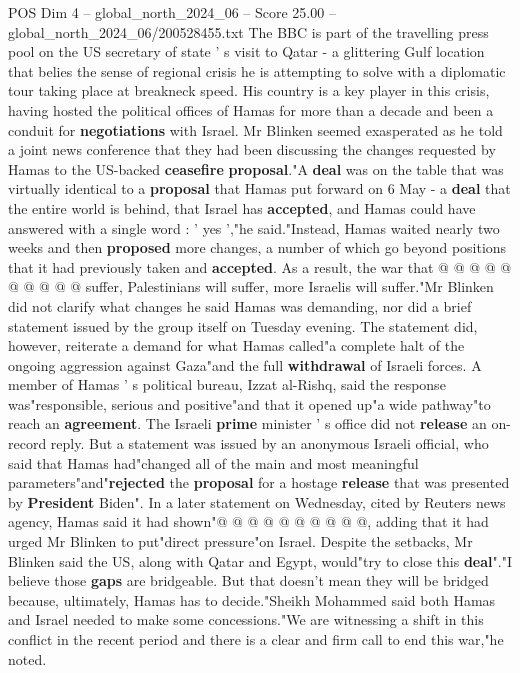 \begin{textsample}{POS Dim 4 – global\_north\_2024\_06 – Score 25.00 – global\_north\_2024\_06/200528455.txt}  \label{ex:f4_pos_145}
The BBC is part of the travelling press pool on the US secretary of state ' s visit to Qatar - a glittering Gulf location that belies the sense of regional crisis he is attempting to solve with a diplomatic tour taking place at breakneck speed.
His country is a key player in this crisis, having hosted the political offices of Hamas for more than a decade and been a conduit for \textbf{negotiations} with Israel.
Mr Blinken seemed exasperated as he told a joint news conference that they had been discussing the changes requested by Hamas to the US-backed \textbf{ceasefire} \textbf{proposal}."A \textbf{deal} was on the table that was virtually identical to a \textbf{proposal} that Hamas put forward on 6 May - a \textbf{deal} that the entire world is behind, that Israel has \textbf{accepted}, and Hamas could have answered with a single word : ' yes ',"he said."Instead, Hamas waited nearly two weeks and then \textbf{proposed} more changes, a number of which go beyond positions that it had previously taken and \textbf{accepted}.
As a result, the war that @ @ @ @ @ @ @ @ @ @ suffer, Palestinians will suffer, more Israelis will suffer."Mr Blinken did not clarify what changes he said Hamas was demanding, nor did a brief statement issued by the group itself on Tuesday evening.
The statement did, however, reiterate a demand for what Hamas called"a complete halt of the ongoing aggression against Gaza"and the full \textbf{withdrawal} of Israeli forces.
A member of Hamas ' s political bureau, Izzat al-Rishq, said the response was"responsible, serious and positive"and that it opened up"a wide pathway"to reach an \textbf{agreement}.
The Israeli \textbf{prime} minister ' s office did not \textbf{release} an on-record reply.
But a statement was issued by an anonymous Israeli official, who said that Hamas had"changed all of the main and most meaningful parameters"and"\textbf{rejected} the \textbf{proposal} for a hostage \textbf{release} that was presented by \textbf{President} Biden".
In a later statement on Wednesday, cited by Reuters news agency, Hamas said it had shown"@ @ @ @ @ @ @ @ @ @, adding that it had urged Mr Blinken to put"direct pressure"on Israel.
Despite the setbacks, Mr Blinken said the US, along with Qatar and Egypt, would"try to close this \textbf{deal}"."I believe those \textbf{gaps} are bridgeable.
But that doesn't mean they will be bridged because, ultimately, Hamas has to decide."Sheikh Mohammed said both Hamas and Israel needed to make some concessions."We are witnessing a shift in this conflict in the recent period and there is a clear and firm call to end this war,"he noted.

\end{textsample}
